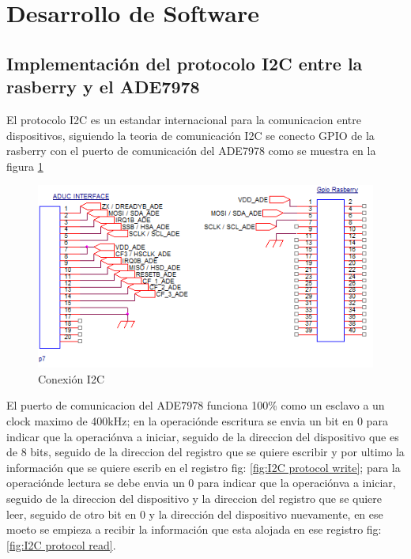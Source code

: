 \section{Desarrollo de Software}
    \subsection{Implementación del protocolo I2C entre la rasberry y el ADE7978}

        El protocolo I2C es un estandar internacional para la comunicacion entre dispositivos, siguiendo la teoria de comunicación I2C se conecto GPIO de la rasberry con el puerto de comunicación del ADE7978 como se muestra en la figura 
        \ref{fig:Coneccion I2C}\\
        \begin{figure}[H]
            \begin{center}
                \includegraphics[width = 15cm]{3Proyecto/I2Cconnection.png}
                \caption{ Conexión I2C } 
                \label{fig:Coneccion I2C}
            \end{center}
        \end{figure}

        El puerto de comunicacion del ADE7978 funciona 100\% como un esclavo a un clock maximo de 400kHz; en la operaciónde escritura se envia un bit en 0  para indicar que la operaciónva a iniciar, seguido de la direccion del dispositivo que es de 8 bits, seguido de la direccion del registro que se quiere escribir y por ultimo la información que se quiere escrib en el registro fig: \ref{fig:I2C protocol write}; para la operaciónde lectura se debe envia un 0 para indicar que la operaciónva a iniciar, seguido de la direccion del dispositivo y la direccion del registro que se quiere leer, seguido de otro bit en 0 y la dirección del dispositivo nuevamente, en ese moeto se empieza a recibir la información que esta alojada en ese registro fig: \ref{fig:I2C protocol read}.
        
